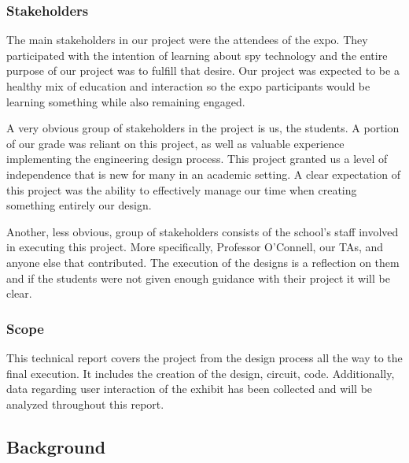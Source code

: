 \documentclass[conference]{IEEEtran}
\begin{document}
\subsubsection{Stakeholders}

    \par The main stakeholders in our project were the attendees of the expo. They participated with the intention of learning about spy technology and the entire purpose of our project was to fulfill that desire. Our project was expected to be a healthy mix of education and interaction so the expo participants would be learning something while also remaining engaged. 
\par A very obvious group of stakeholders in the project is us, the students. A portion of our grade was reliant on this project, as well as valuable experience implementing the engineering design process. This project granted us a level of independence that is new for many in an academic setting. A clear expectation of this project was the ability to effectively manage our time when creating something entirely our design. 
    \par Another, less obvious, group of stakeholders consists of the school’s staff involved in executing this project. More specifically, Professor O’Connell, our TAs, and anyone else that contributed. The execution of the designs is a reflection on them and if the students were not given enough guidance with their project it will be clear.

    \subsubsection{Scope}

\par This technical report covers the project from the design process all the way to the final execution. It includes the creation of the design, circuit, code. Additionally, data regarding user interaction of the exhibit has been collected and will be analyzed throughout this report. 

\subsection{Background}
\end{document}
